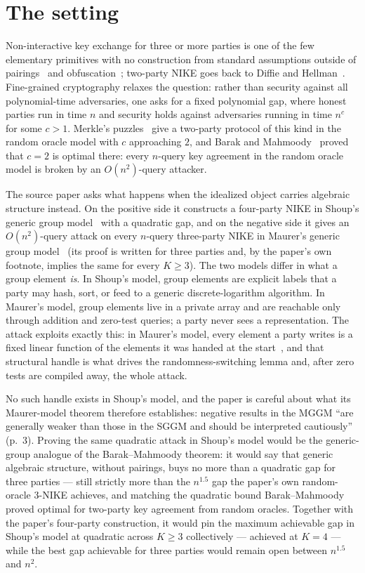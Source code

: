 \documentclass{conjura-conjecture}
\begin{document}
\section{The setting}\label{sec:setting}

Non-interactive key exchange for three or more parties is one of the few
elementary primitives with no construction from standard assumptions
outside of pairings~\cite{Jou00} and obfuscation~\cite{BZ14}; two-party
NIKE goes back to Diffie and Hellman~\cite{DH76}. Fine-grained
cryptography relaxes the question: rather than security against all
polynomial-time adversaries, one asks for a fixed polynomial gap, where
honest parties run in time $n$ and security holds against adversaries
running in time $n^{c}$ for some $c > 1$. Merkle's puzzles~\cite{Mer78}
give a two-party protocol of this kind in the random oracle model with
$c$ approaching $2$, and Barak and Mahmoody~\cite{BM09,BM17} proved that
$c = 2$ is optimal there: every $n$-query key agreement in the random
oracle model is broken by an $O(n^{2})$-query attacker.

The source paper asks what happens when the idealized object carries
algebraic structure instead. On the positive side it constructs a
four-party NIKE in Shoup's generic group model~\cite{Sho97} with a
quadratic gap, and on the negative side it gives an $O(n^{2})$-query
attack on every $n$-query three-party NIKE in Maurer's generic group
model~\cite{Mau05} (its proof is written for three parties and, by the
paper's own footnote, implies the same for every $K \ge 3$). The two
models differ in what a group element \emph{is}. In Shoup's model, group
elements are explicit labels that a party may hash, sort, or feed to a
generic discrete-logarithm algorithm. In Maurer's model, group elements
live in a private array and are reachable only through addition and
zero-test queries; a party never sees a representation. The attack
exploits exactly this: in Maurer's model, every element a party writes
is a fixed linear function of the elements it was handed at the
start~\cite{FKL17}, and that structural handle is what drives the
randomness-switching lemma and, after zero tests are compiled away, the
whole attack.

No such handle exists in Shoup's model, and the paper is careful about
what its Maurer-model theorem therefore establishes: negative results in
the MGGM ``are generally weaker than those in the SGGM and should be
interpreted cautiously''~\cite{Zha22,DHH21} (p.~3). Proving the same
quadratic attack in Shoup's model would be the generic-group analogue of
the Barak--Mahmoody theorem: it would say that generic algebraic
structure, without pairings, buys no more than a quadratic gap for three
parties --- still strictly more than the $n^{1.5}$ gap the paper's own
random-oracle 3-NIKE achieves, and matching the quadratic bound
Barak--Mahmoody proved optimal for two-party key agreement from random
oracles. Together with the paper's four-party construction, it would pin
the maximum achievable gap in Shoup's model at quadratic across
$K \ge 3$ collectively --- achieved at $K = 4$ --- while the best gap
achievable for three parties would remain open between $n^{1.5}$ and
$n^{2}$.
\end{document}
